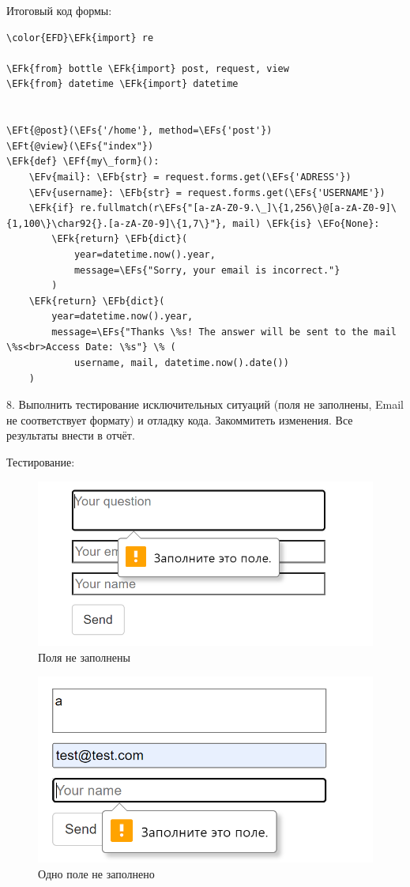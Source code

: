 \documentclass[14pt]{extarticle}
\newcommand{\EFs}[1]{\textcolor{EFs}{#1}} %
\newcommand{\EFk}[1]{\textcolor{EFk}{#1}} %
\newcommand{\EFb}[1]{\textcolor{EFb}{#1}} %
\newcommand{\EFf}[1]{\textcolor{EFf}{#1}} %
\newcommand{\EFv}[1]{\textcolor{EFv}{#1}} %
\newcommand{\EFt}[1]{\textcolor{EFt}{#1}} %
\newcommand{\EFo}[1]{\textcolor{EFo}{#1}} %
\begin{document}
Итоговый код формы:

\begin{Code}
\begin{Verbatim}
\color{EFD}\EFk{import} re

\EFk{from} bottle \EFk{import} post, request, view
\EFk{from} datetime \EFk{import} datetime


\EFt{@post}(\EFs{'/home'}, method=\EFs{'post'})
\EFt{@view}(\EFs{"index"})
\EFk{def} \EFf{my\_form}():
    \EFv{mail}: \EFb{str} = request.forms.get(\EFs{'ADRESS'})
    \EFv{username}: \EFb{str} = request.forms.get(\EFs{'USERNAME'})
    \EFk{if} re.fullmatch(r\EFs{"[a-zA-Z0-9.\_]\{1,256\}@[a-zA-Z0-9]\{1,100\}\char92{}.[a-zA-Z0-9]\{1,7\}"}, mail) \EFk{is} \EFo{None}:
        \EFk{return} \EFb{dict}(
            year=datetime.now().year,
            message=\EFs{"Sorry, your email is incorrect."}
        )
    \EFk{return} \EFb{dict}(
        year=datetime.now().year,
        message=\EFs{"Thanks \%s! The answer will be sent to the mail \%s<br>Access Date: \%s"} \% (
            username, mail, datetime.now().date())
    )
\end{Verbatim}
\end{Code}

​8. Выполнить тестирование исключительных ситуаций (поля не заполнены, Email не соответствует формату) и отладку кода. Закоммитеть изменения. Все результаты внести в отчёт.

Тестирование:
\begin{figure}[H]
\centering
\includegraphics[width=.9\linewidth]{images/2023-04-12_10-22-27_screenshot.png}
\caption{Поля не заполнены}
\end{figure}

\begin{figure}[H]
\centering
\includegraphics[width=.9\linewidth]{images/2023-04-12_10-23-09_screenshot.png}
\caption{Одно поле не заполнено}
\end{figure}
\end{document}
